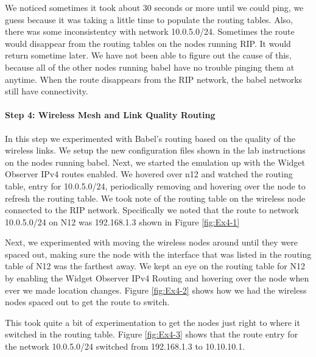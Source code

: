 \documentclass[main.tex]{subfiles}
\begin{document}
\noindent We noticed sometimes it took about 30 seconds or more until we could ping, we guess because it was taking a little time to populate the routing tables. Also, there was some inconsistentcy with network 10.0.5.0/24.  Sometimes the route would disappear from the routing tables on the nodes running RIP.  It would return sometime later.  We have not been able to figure out the cause of this, because all of the other nodes running babel have no trouble pinging them at anytime.  When the route disappears from the RIP network, the babel networks still have connectivity.


\paragraph{Step 4: Wireless Mesh and Link Quality Routing}
\hfill \break
\noindent In this step we experimented with Babel's routing based on the quality of the wireless links.
\noindent We setup the new configuration files shown in the lab instructions on the nodes running babel.
\noindent Next, we started the emulation up with the Widget Observer IPv4 routes enabled.  We hovered over n12 and watched the routing table, entry for 10.0.5.0/24, periodically removing and hovering over the node to refresh the routing table.
\noindent We took note of the routing table on the wireless node connected to the RIP network.  Specifically we noted that the route to network 10.0.5.0/24 on N12 was 192.168.1.3 shown in Figure \ref{fig:Ex4-1}


\noindent Next, we experimented with moving the wireless nodes around until they were spaced out, making sure the node with the interface that was listed in the routing table of N12 was the farthest away.  We kept an eye on the routing table for N12 by enabling the Widget Observer IPv4 Routing and hovering over the node when ever we made location changes.  Figure \ref{fig:Ex4-2} shows how we had the wireless nodes spaced out to get the route to switch.

\noindent This took quite a bit of experimentation to get the nodes just right to where it switched in the routing table.
\noindent Figure \ref{fig:Ex4-3} shows that the route entry for the network 10.0.5.0/24 switched from 192.168.1.3 to 10.10.10.1.
\end{document}

